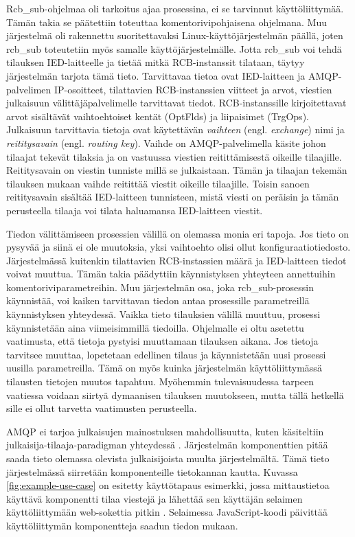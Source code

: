 Rcb\_sub-ohjelmaa oli tarkoitus ajaa prosessina, ei se tarvinnut käyttöliittymää. Tämän takia se päätettiin toteuttaa komentorivipohjaisena ohjelmana. Muu järjestelmä oli rakennettu suoritettavaksi Linux-käyttöjärjestelmän päällä, joten rcb\_sub toteutetiin myös samalle käyttöjärjestelmälle. Jotta rcb\_sub voi tehdä tilauksen IED-laitteelle ja tietää mitkä RCB-instanssit tilataan, täytyy järjestelmän tarjota tämä tieto. Tarvittavaa tietoa ovat IED-laitteen ja AMQP-palvelimen IP-osoitteet, tilattavien RCB-instanssien viitteet ja arvot, viestien julkaisuun välittäjäpalvelimelle tarvittavat tiedot. RCB-instanssille kirjoitettavat arvot sisältävät vaihtoehtoiset kentät (OptFlds) ja liipaisimet (TrgOps). Julkaisuun tarvittavia tietoja ovat käytettävän \emph{vaihteen} (engl. \emph{exchange}) nimi ja \emph{reititysavain} (engl. \emph{routing key}). Vaihde on AMQP-palvelimella käsite johon tilaajat tekevät tilaksia ja on vastuussa viestien reitittämisestä oikeille tilaajille. Reititysavain on viestin tunniste millä se julkaistaan. Tämän ja tilaajan tekemän tilauksen mukaan vaihde reitittää viestit oikeille tilaajille. Toisin sanoen reititysavain sisältää IED-laitteen tunnisteen, mistä viesti on peräisin ja tämän perusteella tilaaja voi tilata haluamansa IED-laitteen viestit.


Tiedon välittämiseen prosessien välillä on olemassa monia eri tapoja. Jos tieto on pysyvää ja siinä ei ole muutoksia, yksi vaihtoehto olisi ollut konfiguraatiotiedosto. Järjestelmässä kuitenkin tilattavien RCB-instassien määrä ja IED-laitteen tiedot voivat muuttua. Tämän takia päädyttiin käynnistyksen yhteyteen annettuihin komentoriviparametreihin. Muu järjestelmän osa, joka rcb\_sub-prosessin käynnistää, voi kaiken tarvittavan tiedon antaa prosessille parametreillä käynnistyksen yhteydessä. Vaikka tieto tilauksien välillä muuttuu, prosessi käynnistetään aina viimeisimmillä tiedoilla. Ohjelmalle ei oltu asetettu vaatimusta, että tietoja pystyisi muuttamaan tilauksen aikana. Jos tietoja tarvitsee muuttaa, lopetetaan edellinen tilaus ja käynnistetään uusi prosessi uusilla parametreilla. Tämä on myös kuinka järjestelmän käyttöliittymässä tilausten tietojen muutos tapahtuu. Myöhemmin tulevaisuudessa tarpeen vaatiessa voidaan siirtyä dymaanisen tilauksen muutokseen, mutta tällä hetkellä sille ei ollut tarvetta vaatimusten perusteella.

AMQP ei tarjoa julkaisujen mainostuksen mahdollisuutta, kuten käsiteltiin julkaisija-tilaaja-paradigman yhteydessä \cite{AMQP-specification}. Järjestelmän komponenttien pitää saada tieto olemassa olevista julkaisijoista muulta järjestelmältä. Tämä tieto järjestelmässä siirretään komponenteille tietokannan kautta. Kuvassa \ref{fig:example-use-case} on esitetty käyttötapaus esimerkki, jossa mittaustietoa käyttävä komponentti tilaa viestejä ja lähettää sen käyttäjän selaimen käyttöliittymään web-sokettia pitkin \cite{websocket}. Selaimessa JavaScript-koodi päivittää käyttöliittymän komponentteja saadun tiedon mukaan.

